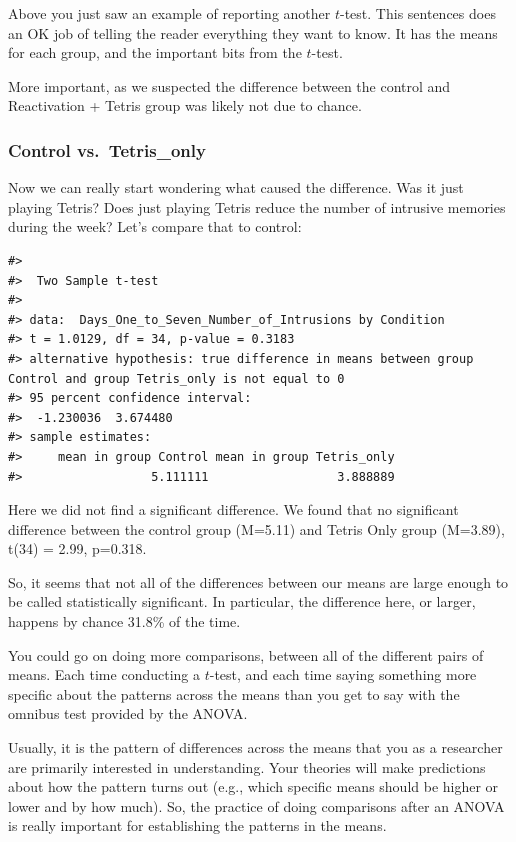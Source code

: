 \documentclass[
  letterpaper,
  DIV=11,
  numbers=noendperiod]{scrreprt}
\begin{document}
Above you just saw an example of reporting another \(t\)-test. This
sentences does an OK job of telling the reader everything they want to
know. It has the means for each group, and the important bits from the
\(t\)-test.

More important, as we suspected the difference between the control and
Reactivation + Tetris group was likely not due to chance.

\subsubsection{Control vs.~Tetris\_only}\label{control-vs.-tetris_only}

Now we can really start wondering what caused the difference. Was it
just playing Tetris? Does just playing Tetris reduce the number of
intrusive memories during the week? Let's compare that to control:

\begin{verbatim}
#> 
#>  Two Sample t-test
#> 
#> data:  Days_One_to_Seven_Number_of_Intrusions by Condition
#> t = 1.0129, df = 34, p-value = 0.3183
#> alternative hypothesis: true difference in means between group Control and group Tetris_only is not equal to 0
#> 95 percent confidence interval:
#>  -1.230036  3.674480
#> sample estimates:
#>     mean in group Control mean in group Tetris_only 
#>                  5.111111                  3.888889
\end{verbatim}

Here we did not find a significant difference. We found that no
significant difference between the control group (M=5.11) and Tetris
Only group (M=3.89), t(34) = 2.99, p=0.318.

So, it seems that not all of the differences between our means are large
enough to be called statistically significant. In particular, the
difference here, or larger, happens by chance 31.8\% of the time.

You could go on doing more comparisons, between all of the different
pairs of means. Each time conducting a \(t\)-test, and each time saying
something more specific about the patterns across the means than you get
to say with the omnibus test provided by the ANOVA.

Usually, it is the pattern of differences across the means that you as a
researcher are primarily interested in understanding. Your theories will
make predictions about how the pattern turns out (e.g., which specific
means should be higher or lower and by how much). So, the practice of
doing comparisons after an ANOVA is really important for establishing
the patterns in the means.
\end{document}
